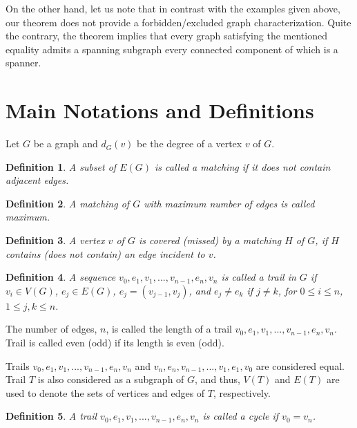\documentclass[a4paper, 12pt]{article}
\newtheorem{definition}{Definition}[section]
\begin{document}
On the other hand, let us note that in contrast with the examples
given above, our theorem does not provide a forbidden/excluded graph
characterization. Quite the contrary, the theorem implies that every
graph satisfying the mentioned equality admits a spanning subgraph
every connected component of which is a spanner.


\section{Main Notations and Definitions}

Let $G$ be a graph and $d_G(v)$ be the degree of a vertex $v$ of
$G$.

\begin{definition}\label{matching_definition}
A subset of $E(G)$ is called a matching if it does not contain
adjacent edges.
\end{definition}

\begin{definition}\label{maximum_matching_definition}
A matching of $G$ with maximum number of edges is called maximum.
\end{definition}

\begin{definition}\label{covered_missed_by_matching}
A vertex $v$ of $G$ is covered (missed) by a matching $H$ of $G$, if
$H$ contains (does not contain) an edge incident to $v$.
\end{definition}

\begin{definition}\label{trail_definition}
A sequence $v_0, e_1, v_1, ..., v_{n-1}, e_n, v_n$ is called a trail
in $G$ if $v_i \in V(G)$, $e_j \in E(G)$, $e_j = (v_{j-1}, v_j)$,
and $e_j \neq e_k$ if $j \neq k$, for $0 \leq i \leq n$, $1 \leq j,k
\leq n$.
\end{definition}

The number of edges, $n$, is called the length of a trail $v_0, e_1,
v_1, ..., v_{n-1}, e_n, v_n$. Trail is called even (odd) if its
length is even (odd).

Trails $v_0, e_1, v_1, ..., v_{n-1}, e_n, v_n$ and $v_n, e_n,
v_{n-1}, ..., v_1, e_1, v_0$ are considered equal. Trail $T$ is also
considered as a subgraph of $G$, and thus, $V(T)$ and $E(T)$ are
used to denote the sets of vertices and edges of $T$, respectively.

\begin{definition}\label{cycle_definition}
A trail $v_0, e_1, v_1, ..., v_{n-1}, e_n, v_n$ is called a cycle if
$v_0 = v_n$.
\end{definition}
\end{document}
